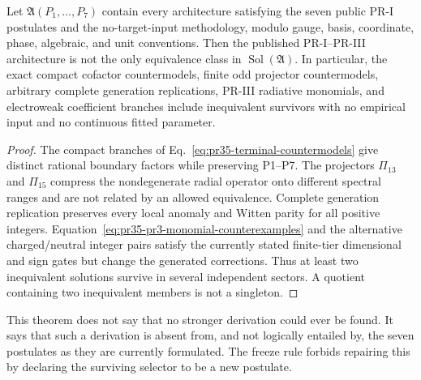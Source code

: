 \begin{theorem}
Let $\mathfrak A(P_1,\ldots,P_7)$ contain every architecture satisfying the
seven public PR-I postulates and the no-target-input methodology, modulo gauge,
basis, coordinate, phase, algebraic, and unit conventions.  Then the published
PR-I--PR-III architecture is not the only equivalence class in
$\operatorname{Sol}(\mathfrak A)$.  In particular, the exact compact cofactor
countermodels, finite odd projector countermodels, arbitrary complete
generation replications, PR-III radiative monomials, and electroweak
coefficient branches include inequivalent survivors with no empirical input
and no continuous fitted parameter.
\end{theorem}

\begin{proof}
The compact branches of Eq.~\eqref{eq:pr35-terminal-countermodels} give
distinct rational boundary factors while preserving P1--P7.  The projectors
$\Pi_{13}$ and $\Pi_{15}$ compress the nondegenerate radial operator onto
different spectral ranges and are not related by an allowed equivalence.
Complete generation replication preserves every local anomaly and Witten
parity for all positive integers.  Equation~\eqref{eq:pr35-pr3-monomial-counterexamples}
and the alternative charged/neutral integer pairs satisfy the currently stated
finite-tier dimensional and sign gates but change the generated corrections.
Thus at least two inequivalent solutions survive in several independent
sectors.  A quotient containing two inequivalent members is not a singleton.
\end{proof}

This theorem does not say that no stronger derivation could ever be found.  It
says that such a derivation is absent from, and not logically entailed by, the
seven postulates as they are currently formulated.  The freeze rule forbids
repairing this by declaring the surviving selector to be a new postulate.
